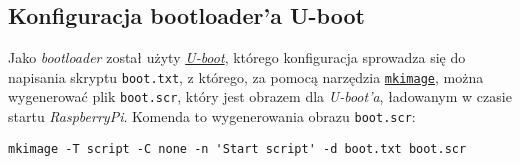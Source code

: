 \documentclass{article}
\begin{document}


\subsection{Konfiguracja bootloader'a U-boot}

Jako \emph{bootloader} został użyty \href{http://www.denx.de/wiki/u-boot/}{\emph{U-boot}}, którego konfiguracja sprowadza się do napisania skryptu \texttt{boot.txt}, z którego, za pomocą narzędzia \href{http://linux.die.net/man/1/mkimage}{\texttt{mkimage}}, można wygenerować plik \texttt{boot.scr}, który jest obrazem dla \emph{U-boot'a}, ładowanym w czasie startu \emph{RaspberryPi}. Komenda to wygenerowania obrazu \texttt{boot.scr}:
\begin{verbatim}
mkimage -T script -C none -n 'Start script' -d boot.txt boot.scr
\end{verbatim}

%
%
%
%
\end{document}
